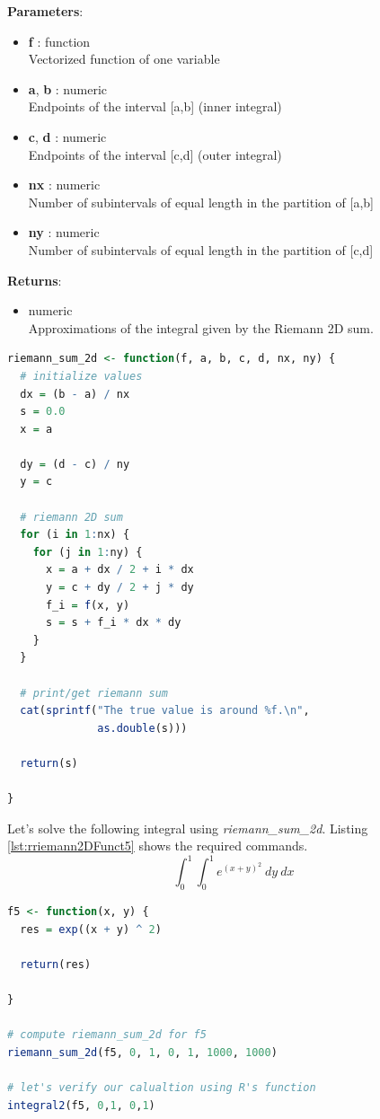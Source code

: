 \documentclass[11pt,a4paper]{article}
\begin{document}
\textbf{Parameters}:
\begin{itemize}
  \item {\textbf{f} : function\\
Vectorized function of one variable}
  \item {\textbf{a}, \textbf{b} : numeric\\
Endpoints of the interval [a,b] (inner integral)}
  \item {\textbf{c}, \textbf{d} : numeric\\
Endpoints of the interval [c,d] (outer integral)}
  \item {\textbf{nx} : numeric\\
Number of subintervals of equal length in the partition of [a,b]}
  \item {\textbf{ny} : numeric\\
Number of subintervals of equal length in the partition of [c,d]}
\end{itemize}

\textbf{Returns}:
\begin{itemize}
  \item {numeric\\
Approximations of the integral given by the Riemann 2D sum.}
\end{itemize}

\clearpage

\begin{lstlisting}[frame=trBL, language=R, caption="The \emph{Riemann 2D} function"
\label{lst:riemann2D}]
riemann_sum_2d <- function(f, a, b, c, d, nx, ny) {  
  # initialize values
  dx = (b - a) / nx
  s = 0.0
  x = a
  
  dy = (d - c) / ny
  y = c
  
  # riemann 2D sum
  for (i in 1:nx) {
    for (j in 1:ny) {
      x = a + dx / 2 + i * dx
      y = c + dy / 2 + j * dy
      f_i = f(x, y)
      s = s + f_i * dx * dy
    }
  }
  
  # print/get riemann sum
  cat(sprintf("The true value is around %f.\n",
              as.double(s)))
  
  return(s)
  
}
\end{lstlisting}

Let's solve the following integral using \emph{riemann\_sum\_2d}. Listing \ref{lst:rriemann2DFunct5} shows the required commands.
$$ \int_{0}^{1} \int_{0}^{1} e^{(x+y)^2} \ dy \ dx $$

\begin{lstlisting}[frame=trBL, language=R, caption="Define the function and implement \emph{riemann\_sum\_2d}"
\label{lst:rriemann2DFunct5}]
f5 <- function(x, y) {
  res = exp((x + y) ^ 2)
  
  return(res)
  
}

# compute riemann_sum_2d for f5
riemann_sum_2d(f5, 0, 1, 0, 1, 1000, 1000)

# let's verify our calualtion using R's function
integral2(f5, 0,1, 0,1)
\end{lstlisting}
\end{document}
